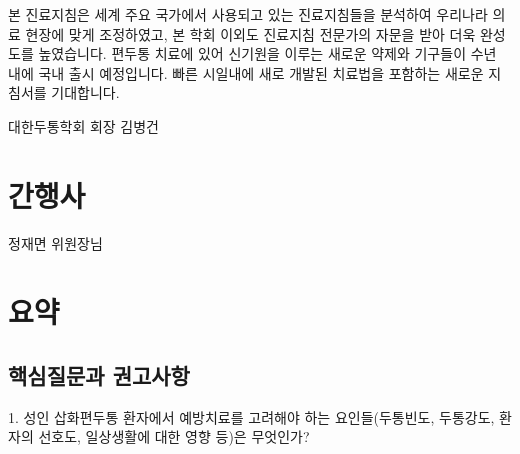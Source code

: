 \documentclass[]{book}
\begin{document}
본 진료지침은 세계 주요 국가에서 사용되고 있는 진료지침들을 분석하여 우리나라 의료 현장에 맞게 조정하였고, 본 학회 이외도 진료지침 전문가의 자문을 받아 더욱 완성도를 높였습니다. 편두통 치료에 있어 신기원을 이루는 새로운 약제와 기구들이 수년 내에 국내 출시 예정입니다. 빠른 시일내에 새로 개발된 치료법을 포함하는 새로운 지침서를 기대합니다.

대한두통학회 회장 김병건

\hypertarget{section-3}{%
\chapter*{간행사}\label{section-3}}

정재면 위원장님

\mainmatter

\hypertarget{section-4}{%
\chapter{요약}\label{section-4}}

\hypertarget{section-5}{%
\section{핵심질문과 권고사항}\label{section-5}}

1. 성인 삽화편두통 환자에서 예방치료를 고려해야 하는 요인들(두통빈도, 두통강도, 환자의 선호도, 일상생활에 대한 영향 등)은 무엇인가?
\end{document}
